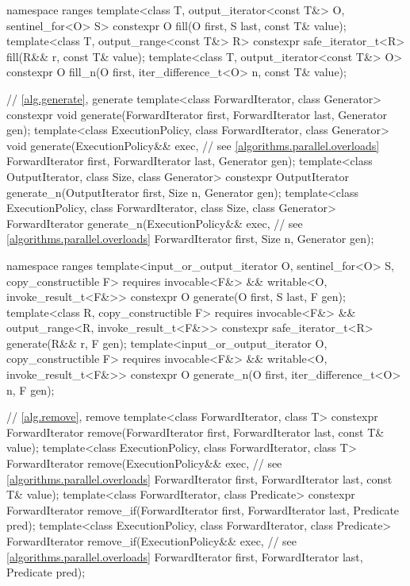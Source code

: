 \begin{codeblock}
{  namespace ranges {
    template<class T, output_iterator<const T&> O, sentinel_for<O> S>
      constexpr O fill(O first, S last, const T& value);
    template<class T, output_range<const T&> R>
      constexpr safe_iterator_t<R> fill(R&& r, const T& value);
    template<class T, output_iterator<const T&> O>
      constexpr O fill_n(O first, iter_difference_t<O> n, const T& value);
  }

  // \ref{alg.generate}, generate
  template<class ForwardIterator, class Generator>
    constexpr void generate(ForwardIterator first, ForwardIterator last,
                            Generator gen);
  template<class ExecutionPolicy, class ForwardIterator, class Generator>
    void generate(ExecutionPolicy&& exec,                       // see \ref{algorithms.parallel.overloads}
                  ForwardIterator first, ForwardIterator last,
                  Generator gen);
  template<class OutputIterator, class Size, class Generator>
    constexpr OutputIterator generate_n(OutputIterator first, Size n, Generator gen);
  template<class ExecutionPolicy, class ForwardIterator, class Size, class Generator>
    ForwardIterator generate_n(ExecutionPolicy&& exec,          // see \ref{algorithms.parallel.overloads}
                               ForwardIterator first, Size n, Generator gen);

  namespace ranges {
    template<input_or_output_iterator O, sentinel_for<O> S, copy_constructible F>
      requires invocable<F&> && writable<O, invoke_result_t<F&>>
      constexpr O generate(O first, S last, F gen);
    template<class R, copy_constructible F>
      requires invocable<F&> && output_range<R, invoke_result_t<F&>>
      constexpr safe_iterator_t<R> generate(R&& r, F gen);
    template<input_or_output_iterator O, copy_constructible F>
      requires invocable<F&> && writable<O, invoke_result_t<F&>>
      constexpr O generate_n(O first, iter_difference_t<O> n, F gen);
  }

  // \ref{alg.remove}, remove
  template<class ForwardIterator, class T>
    constexpr ForwardIterator remove(ForwardIterator first, ForwardIterator last,
                                     const T& value);
  template<class ExecutionPolicy, class ForwardIterator, class T>
    ForwardIterator remove(ExecutionPolicy&& exec,              // see \ref{algorithms.parallel.overloads}
                           ForwardIterator first, ForwardIterator last,
                           const T& value);
  template<class ForwardIterator, class Predicate>
    constexpr ForwardIterator remove_if(ForwardIterator first, ForwardIterator last,
                                        Predicate pred);
  template<class ExecutionPolicy, class ForwardIterator, class Predicate>
    ForwardIterator remove_if(ExecutionPolicy&& exec,           // see \ref{algorithms.parallel.overloads}
                              ForwardIterator first, ForwardIterator last,
                              Predicate pred);

}
\end{codeblock}
